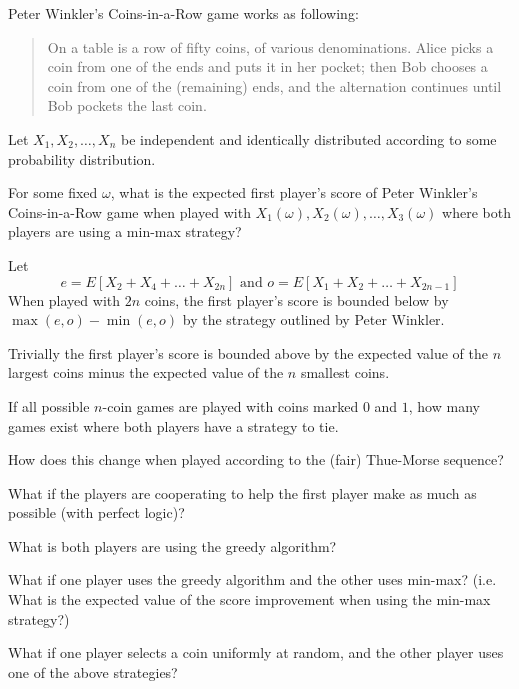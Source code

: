 \documentclass{article}
\begin{document}
  Peter Winkler's Coins-in-a-Row game works as following:
  \begin{quote}
    On a table is a row of fifty coins, of various denominations.
    Alice picks a coin from one of the ends and puts it in her pocket;
    then Bob chooses a coin from one of the (remaining) ends,
    and the alternation continues until Bob pockets the last coin.
  \end{quote}

  Let $X_1, X_2, \hdots, X_n$ be independent and identically distributed
  according to some probability distribution.

\begin{question}
  For some fixed $\omega$, what is
  the expected first player's score of Peter Winkler's Coins-in-a-Row game when
  played with $X_1(\omega), X_2(\omega), \hdots, X_3(\omega)$ where both players
  are using a min-max strategy?
\end{question}

\begin{note}
  Let \[
    e = E[X_2 + X_4 + \hdots + X_{2n}] \text{ and }
    o = E[X_1 + X_2 + \hdots + X_{2n - 1}]
  \]
  When played with $2n$ coins, the first player's score is bounded below by $
    \max(e, o) - \min(e, o)
  $ by the strategy outlined by Peter Winkler.

  Trivially the first player's score is bounded above by the expected value of
  the $n$ largest coins minus the expected value of the $n$ smallest coins.
\end{note}

\begin{related}
  \item If all possible $n$-coin games are played with coins marked $0$ and $1$,
    how many games exist where both players have a strategy to tie.
  \item How does this change when played according to the (fair) Thue-Morse sequence?
  \item What if the players are cooperating to help the first player make as
    much as possible (with perfect logic)?
  \item What is both players are using the greedy algorithm?
  \item What if one player uses the greedy algorithm and the other uses min-max?
    (i.e. What is the expected value of the score improvement when using the
    min-max strategy?)
  \item What if one player selects a coin uniformly at random, and the other
    player uses one of the above strategies?
\end{related}
\end{document}
